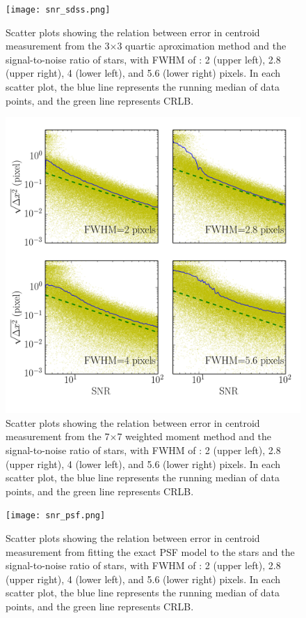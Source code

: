 \documentclass[12pt, preprint]{aastex}
\begin{document}
\begin{figure}[!htb]
  \texttt{[image: snr\_sdss.png]}
\endminipage
\caption{Scatter plots showing the relation between error in centroid measurement from the 3$\times$3 quartic aproximation method and the signal-to-noise ratio of stars, with FWHM of : 2 (upper left), 2.8 (upper right), 4 (lower left), and 5.6 (lower right) pixels. In each scatter plot, the blue line represents the running median of data points, and the green line represents CRLB.}\label{3}
\end{figure}

\begin{figure}[!htb]
  \includegraphics[width=\linewidth]{snr_moment.png}
\endminipage
\caption{Scatter plots showing the relation between error in centroid measurement
from the 7$\times$7 weighted moment method and the signal-to-noise ratio of stars,
with FWHM of : 2 (upper left), 2.8 (upper right), 4 (lower left), and 5.6 (lower right)
pixels. In each scatter plot, the blue line represents the running median of data points,
and the green line represents CRLB.}\label{4}
\end{figure}

\begin{figure}[!htb]
  \texttt{[image: snr\_psf.png]}
\endminipage
\caption{Scatter plots showing the relation between error in centroid measurement
from fitting the exact PSF model to the stars and the signal-to-noise ratio of stars,
with FWHM of : 2 (upper left), 2.8 (upper right), 4 (lower left), and 5.6 (lower right)
pixels. In each scatter plot, the blue line represents the running median of data points,
and the green line represents CRLB.}\label{5}
\end{figure}
\end{document}
